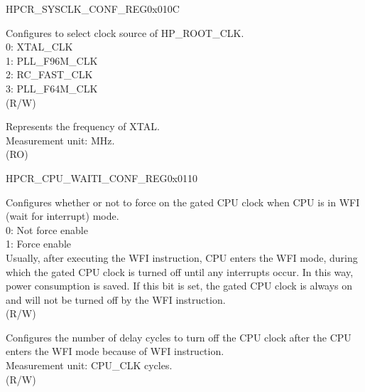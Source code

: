 \begin{register}{H}{PCR\_SYSCLK\_CONF\_REG}{0x010C}\label{regdesc:PCRSYSCLKCONFREG}
%
%
%
%
%
\regnewline%
\begin{regdesc}\begin{reglist}
\label{fielddesc:PCRSOCCLKSEL}\item [PCR\_SOC\_CLK\_SEL] Configures to select clock source of HP\_ROOT\_CLK. \\
0: XTAL\_CLK \\
1: PLL\_F96M\_CLK \\
2: RC\_FAST\_CLK \\ 
3: PLL\_F64M\_CLK \\ (R/W)
\label{fielddesc:PCRCLKXTALFREQ}\item [PCR\_CLK\_XTAL\_FREQ] Represents the frequency of XTAL.\\
Measurement unit: MHz.\\(RO)
\end{reglist}\end{regdesc}
\end{register}


\begin{register}{H}{PCR\_CPU\_WAITI\_CONF\_REG}{0x0110}\label{regdesc:PCRCPUWAITICONFREG}
%
%
%
%
\regnewline%
\begin{regdesc}\begin{reglist}
\label{fielddesc:PCRCPUWAITMODEFORCEON}\item [PCR\_CPU\_WAIT\_MODE\_FORCE\_ON] Configures whether or not to force on the gated CPU clock when CPU is in WFI (wait for interrupt) mode.\\
0: Not force enable\\
1: Force enable\\
Usually, after executing the WFI instruction, CPU enters the WFI mode, during which the gated CPU clock is turned off until any interrupts occur. In this way, power consumption is saved. If this bit is set, the gated CPU clock is always on and will not be turned off by the WFI instruction.\\(R/W)
\label{fielddesc:PCRCPUWAITIDELAYNUM}\item [PCR\_CPU\_WAITI\_DELAY\_NUM] Configures the number of delay cycles to turn off the CPU clock after the CPU enters the WFI mode because of WFI instruction.\\
Measurement unit: CPU\_CLK cycles.\\ (R/W)
\end{reglist}\end{regdesc}
\end{register}



